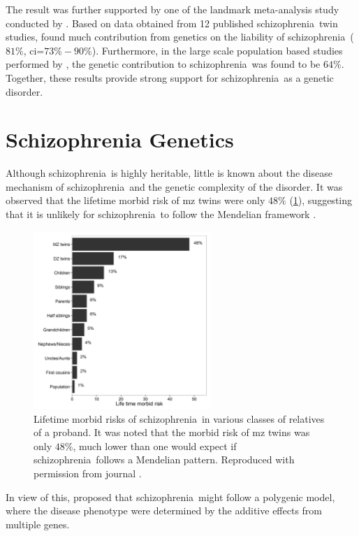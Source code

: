 \documentclass[12pt]{scrbook}
\newcommand*{\scz}{schizophrenia}
\begin{document}
The result was further supported by one of the landmark meta-analysis study conducted by \citet{Sullivan2003}.
Based on data obtained from 12 published \scz\ twin studies, \citet{Sullivan2003} found much contribution from genetics on the liability of \scz\ ($81\%$, \gls{ci}=$73\%-90\%$).
Furthermore, in the large scale population based studies performed by \citet{Lichtenstein2009}, the genetic contribution to \scz\ was found to be $64\%$.
Together, these results provide strong support for \scz\ as a genetic disorder. 

\section{Schizophrenia Genetics}
Although \scz\ is highly heritable, little is known about the disease mechanism of \scz\ and the genetic complexity of the disorder. 
It was observed that the lifetime morbid risk of \gls{mz} twins were only $48\%$ (\cref{fig:lifeMRscz}), suggesting that it is unlikely for \scz\ to follow the Mendelian framework \citep{Gottesman1967,Gottesman1982,gottesman1991schizophrenia}.	
\begin{figure}[t]
	\centering
	\includegraphics[width=0.6\textwidth]{figure/lifeTimeMorbidRisk.png}
	\caption[Lifetime morbid risks of \scz\ in various classes of relatives of a proband]{Lifetime morbid risks of \scz\ in various classes of relatives of a proband.
It was noted that the morbid risk of \gls{mz} twins was only $48\%$, much lower than one would expect if \scz\ follows a Mendelian pattern.
	Reproduced with permission from journal \citep{Riley2006}. \label{fig:lifeMRscz}}
\end{figure}
	
In view of this, \citet{Gottesman1967} proposed that \scz\ might follow a polygenic model, where the disease phenotype were determined by the additive effects from multiple genes.
	
\end{document}
